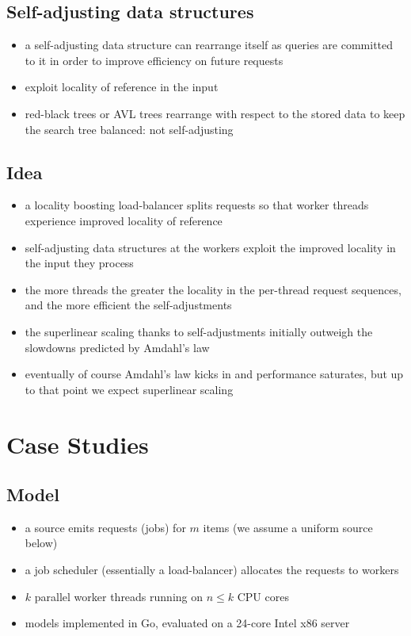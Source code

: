 \documentclass[11pt]{article}
\begin{document}
\subsection{Self-adjusting data structures}
\label{sec:org6cf39c7}
\begin{itemize}
\item a self-adjusting data structure can rearrange itself as queries are committed to it in order to
improve efficiency on future requests
\item exploit locality of reference in the input
\item red-black trees or AVL trees rearrange with respect to the stored data to keep the search tree
balanced: not self-adjusting
\end{itemize}

\subsection{Idea}
\label{sec:org591e535}
\begin{itemize}
\item a locality boosting load-balancer splits requests so that worker threads experience improved
locality of reference
\item self-adjusting data structures at the workers exploit the improved locality in the input they
process
\item the more threads the greater the locality in the per-thread request sequences, and the more
efficient the self-adjustments
\item the superlinear scaling thanks to self-adjustments initially outweigh the slowdowns predicted by
Amdahl's law
\item eventually of course Amdahl's law kicks in and performance saturates, but up to that point we
expect superlinear scaling
\end{itemize}

\section{Case Studies}
\label{sec:orgfa6e163}

\subsection{Model}
\label{sec:org2122015}
\begin{itemize}
\item a source emits requests (jobs) for \(m\) items (we assume a uniform source below)
\item a job scheduler (essentially a load-balancer) allocates the requests to workers
\item \(k\) parallel worker threads running on \(n\le k\) CPU cores
\item models implemented in Go, evaluated on a 24-core Intel x86 server
\end{itemize}
\end{document}
